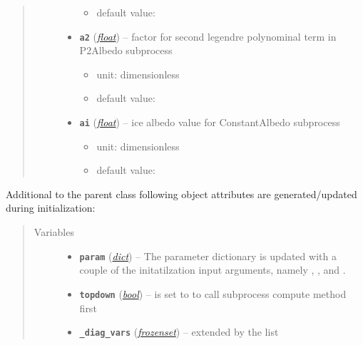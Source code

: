 \documentclass[letterpaper,10pt,english]{sphinxmanual}
\begin{document}
\begin{fulllineitems}
\begin{quote}
\begin{description}
\begin{itemize}
\begin{itemize}
\item {} 
default value: 

\end{itemize}


\item {} 
\textbf{\texttt{a2}} (\href{http://docs.python.org/2.7/library/functions.html\#float}{\emph{float}}) -- 
factor for second legendre polynominal term in P2Albedo subprocess
\begin{itemize}
\item {} 
unit: dimensionless

\item {} 
default value: 

\end{itemize}


\item {} 
\textbf{\texttt{ai}} (\href{http://docs.python.org/2.7/library/functions.html\#float}{\emph{float}}) -- 
ice albedo value for ConstantAlbedo subprocess
\begin{itemize}
\item {} 
unit: dimensionless

\item {} 
default value: 

\end{itemize}


\end{itemize}

\end{description}\end{quote}

Additional to the parent class 
{\hyperref[api/climlab.process:climlab.process.diagnostic.DiagnosticProcess]{\emph{}}}
following object attributes are generated/updated during initialization:
\begin{quote}\begin{description}
\item[{Variables}] \leavevmode\begin{itemize}
\item {} 
\textbf{\texttt{param}} (\href{http://docs.python.org/2.7/library/stdtypes.html\#dict}{\emph{dict}}) -- The parameter dictionary is updated with 
a couple of the initatilzation input 
arguments, namely , , 
 and .

\item {} 
\textbf{\texttt{topdown}} (\href{http://docs.python.org/2.7/library/functions.html\#bool}{\emph{bool}}) -- is set to  to call subprocess
compute method first

\item {} 
\textbf{\texttt{\_diag\_vars}} (\href{http://docs.python.org/2.7/library/stdtypes.html\#frozenset}{\emph{frozenset}}) -- extended by the list \code{{[}'albedo',{]}}

\end{itemize}

\end{description}\end{quote}

\end{fulllineitems}
\end{document}
